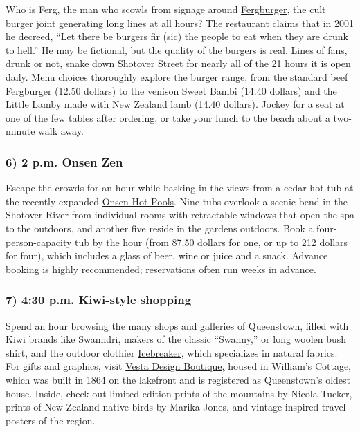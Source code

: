 Who is Ferg, the man who scowls from signage around
\href{https://www.fergburger.com/}{Fergburger}, the cult burger joint
generating long lines at all hours? The restaurant claims that in 2001
he decreed, ``Let there be burgers fir (sic) the people to eat when they
are drunk to hell.'' He may be fictional, but the quality of the burgers
is real. Lines of fans, drunk or not, snake down Shotover Street for
nearly all of the 21 hours it is open daily. Menu choices thoroughly
explore the burger range, from the standard beef Fergburger (12.50
dollars) to the venison Sweet Bambi (14.40 dollars) and the Little Lamby
made with New Zealand lamb (14.40 dollars). Jockey for a seat at one of
the few tables after ordering, or take your lunch to the beach about a
two-minute walk away.

\hypertarget{6-2-pm-onsen-zen}{%
\subsubsection{\texorpdfstring{\textbf{6) 2 p.m. Onsen
Zen}}{6) 2 p.m. Onsen Zen}}\label{6-2-pm-onsen-zen}}

Escape the crowds for an hour while basking in the views from a cedar
hot tub at the recently expanded \href{https://www.onsen.co.nz/}{Onsen
Hot Pools}. Nine tubs overlook a scenic bend in the Shotover River from
individual rooms with retractable windows that open the spa to the
outdoors, and another five reside in the gardens outdoors. Book a
four-person-capacity tub by the hour (from 87.50 dollars for one, or up
to 212 dollars for four), which includes a glass of beer, wine or juice
and a snack. Advance booking is highly recommended; reservations often
run weeks in advance.

\hypertarget{7-430-pm-kiwi-style-shopping}{%
\subsubsection{\texorpdfstring{\textbf{7) 4:30 p.m. Kiwi-style
shopping}}{7) 4:30 p.m. Kiwi-style shopping}}\label{7-430-pm-kiwi-style-shopping}}

Spend an hour browsing the many shops and galleries of Queenstown,
filled with Kiwi brands like
\href{https://www.swanndri.co.nz/}{Swanndri}, makers of the classic
``Swanny,'' or long woolen bush shirt, and the outdoor clothier
\href{https://www.icebreaker.com/en-us/home}{Icebreaker}, which
specializes in natural fabrics. For gifts and graphics, visit
\href{https://www.vestadesign.co.nz/}{Vesta Design Boutique,} housed in
William's Cottage, which was built in 1864 on the lakefront and is
registered as Queenstown's oldest house. Inside, check out limited
edition prints of the mountains by Nicola Tucker, prints of New Zealand
native birds by Marika Jones, and vintage-inspired travel posters of the
region.

